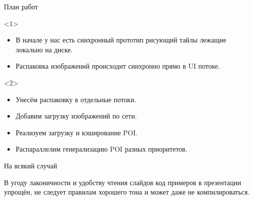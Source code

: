 \documentclass[aspectratio=169,hyperref={unicode},17pt]{beamer}
\begin{document}
\begin{frame}[t]{План работ}
\begin{onlyenv}<1>
\begin{itemize}
 \item В начале у нас есть синхронный прототип рисующий тайлы лежащие локально на диске.
 \item Распаковка изображений происходит синхронно прямо в UI потоке.
\end{itemize}
\end{onlyenv}
\begin{onlyenv}<2>
\begin{itemize}
 \item Унесём распаковку в отдельные потоки.
 \item Добавим загрузку изображений по сети.
 \item Реализуем загрузку и кэширование POI.
 \item Распараллелим генерализацию POI разных приоритетов.
\end{itemize}
\end{onlyenv}
\end{frame}

\begin{frame}[t]{На всякий случай}

В угоду лаконичности и удобству чтения слайдов код примеров в презентации упрощён, не следует правилам хорошего тона и
может даже не компилироваться.

\end{frame}
\end{document}
